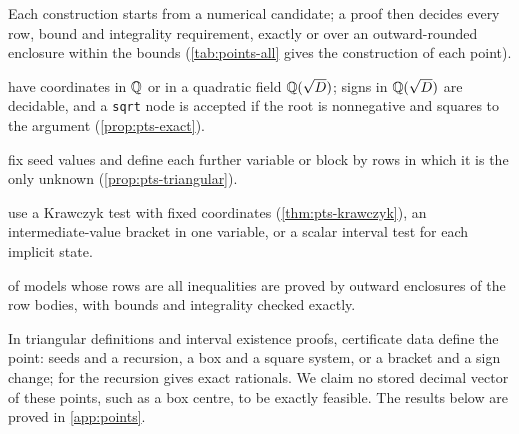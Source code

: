 Each construction starts from a numerical candidate; a proof then decides every row, bound and integrality requirement, exactly or over an outward-rounded enclosure within the bounds (\cref{tab:points-all} gives the construction of each point).
\begin{description}\setlength{\itemsep}{0pt}\setlength{\parsep}{0pt}
\item[Explicit exact points] have coordinates in $\mathbb{Q}$ or in a quadratic field $\mathbb{Q}(\sqrt D)$; signs in $\mathbb{Q}(\sqrt D)$ are decidable, and a \texttt{sqrt} node is accepted if the root is nonnegative and squares to the argument (\cref{prop:pts-exact}).
\item[Triangular definitions] fix seed values and define each further variable or block by rows in which it is the only unknown (\cref{prop:pts-triangular}).
\item[Interval existence proofs] use a Krawczyk test with fixed coordinates (\cref{thm:pts-krawczyk}), an intermediate-value bracket in one variable, or a scalar interval test for each implicit state.
\item[Strictly interior points] of models whose rows are all inequalities are proved by outward enclosures of the row bodies, with bounds and integrality checked exactly.
\end{description}
In triangular definitions and interval existence proofs, certificate data define the point: seeds and a recursion, a box and a square system, or a bracket and a sign change; for  the recursion gives exact rationals.
We claim no stored decimal vector of these points, such as a box centre, to be exactly feasible.
The results below are proved in \cref{app:points}.

